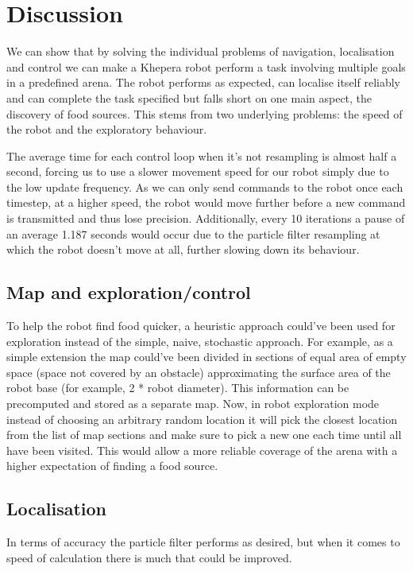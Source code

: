 \documentclass[paper=a4, fontsize=12pt]{scrartcl}	%
\numberwithin{equation}{section}		%
\numberwithin{figure}{section}			%
\numberwithin{table}{section}				%
\begin{document}
\section{Discussion}
We can show that by solving the individual problems of navigation, localisation and control we can make a Khepera robot perform a task involving multiple goals in a predefined arena. The robot performs as expected, can localise itself reliably and can complete the task specified but falls short on one main aspect, the discovery of food sources. This stems from two underlying problems: the speed of the robot and the exploratory behaviour.

The average time for each control loop when it's not resampling is almost half a second, forcing us to use a slower movement speed for our robot simply due to the low update frequency. As we can only send commands to the robot once each timestep, at a higher speed, the robot would move further before a new command is transmitted and thus lose precision. Additionally, every 10 iterations a pause of an average 1.187 seconds would occur due to the particle filter resampling at which the robot doesn't move at all, further slowing down its behaviour.

\subsection{Map and exploration/control}
To help the robot find food quicker, a heuristic approach could've been used for exploration instead of the simple, naive, stochastic approach. For example, as a simple extension the map could've been divided in sections of equal area of empty space (space not covered by an obstacle) approximating the surface area of the robot base (for example, 2 * robot diameter). This information can be precomputed and stored as a separate map. Now, in robot exploration mode instead of choosing an arbitrary random location it will pick the closest location from the list of map sections and make sure to pick a new one each time until all have been visited. This would allow a more reliable coverage of the arena with a higher expectation of finding a food source.

\subsection{Localisation}
In terms of accuracy the particle filter performs as desired, but when it comes to speed of calculation there is much that could be improved.
\end{document}

